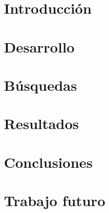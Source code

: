 \documentclass[11pt,a4paper]{tesis}
\begin{document}
\def\titulo{Licenciado }
\def\autor{Amit Stein, Juan Andrés Knebel}
\def\tituloTesis{Composite Retrival: \mbox{Algo}}
\def\runtitulo{Composite Retrival en español}
\def\runtitle{Composite Retrival en ingles}
\def\director{Obi-Wan Kenobi}
\def\codirector{Master Yoda}
\def\lugar{Buenos Aires, 2014}
%

\frontmatter
\pagestyle{empty}


\cleardoublepage
%



\cleardoublepage
\tableofcontents

\mainmatter
\pagestyle{headings}


\chapter{Introducción}

\chapter{Desarrollo}

\chapter{Búsquedas}

\chapter{Resultados}

\chapter{Conclusiones}

%
\chapter{Trabajo futuro}

%


\backmatter
 
\end{document}
